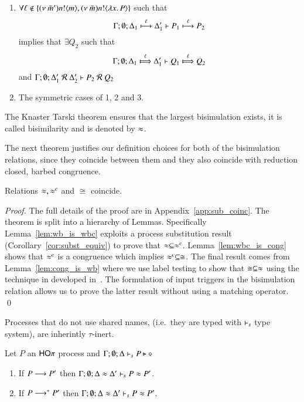 \begin{definition}[Bisimulation]
\begin{enumerate}
		\item	$\forall \ell \notin \set{\news{\tilde{m}'} \bactout{n}{m}, \news{\tilde{m}} \bactout{n}{\abs{x}{P}}}$ such that
			\[
				\horel{\Gamma}{\Delta_1}{P_1}{\hby{\ell}}{\Delta_1'}{P_2}
			\]
			implies that $\exists Q_2$ such that 
			\[
				\horel{\Gamma}{\Delta_1}{Q_1}{\Hby{\ell}}{\Delta_1'}{Q_2}
			\]
			and
			$\horel{\Gamma}{\Delta_1'}{P_2}{\ \mathcal{R}\ }{\Delta_2'}{Q_2}$

		\item	The symmetric cases of 1, 2 and 3.
	\end{enumerate}
	The Knaster Tarski theorem ensures that the largest bisimulation exists, it is called bisimilarity and is denoted by $\wb$.
\end{definition}

The next theorem justifies our definition choices
for both of the bisimulation relations, since
they coincide between them and they also
coincide with reduction closed, barbed congruence.

\begin{theorem}[Coincidence]\rm
	\label{the:coincidence}
	Relations $\wb, \wbc$ and $\cong$ coincide.
\end{theorem}

\begin{proof}
	The full details of the proof are in Appendix~\ref{app:sub_coinc}.
	The theorem is split into a hierarchy of Lemmas. Specifically
	Lemma~\ref{lem:wb_is_wbc} exploits a process substitution result
	(Corollary~\ref{cor:subst_equiv}) to prove that $\wb \subseteq \wbc$.
	Lemma~\ref{lem:wbc_is_cong} shows that $\wbc$ is a congruence
	which implies $\wbc \subseteq \cong$.
	The final result comes from Lemma~\ref{lem:cong_is_wb} where
	we use label testing to show that $\cong \subseteq \wb$ using
	the technique in developed in~\cite{Hennessy07}. The formulation of input
	triggers in the bisimulation relation allows us to prove
	the latter result without using a matching operator.
	\qed
\end{proof}

Processes that do not use shared names, (i.e.~they are typed with
$\proves_s$ type system), are inherintly $\tau$-inert.

\begin{lemma}\rm
	\label{lem:tau_inert}
	Let $P$ an $\HOp$ process
	and $\Gamma; \emptyset; \Delta \proves_s P \hastype \Proc$
	\begin{enumerate}
		\item	If $P \red P'$ then $\Gamma; \es; \Delta \wb \Delta' \proves_s P \wb P'$.
		\item	If $P \red^* P'$ then $\Gamma; \es; \Delta \wb \Delta' \proves_s P \wb P'$.
	\end{enumerate}
\end{lemma}

